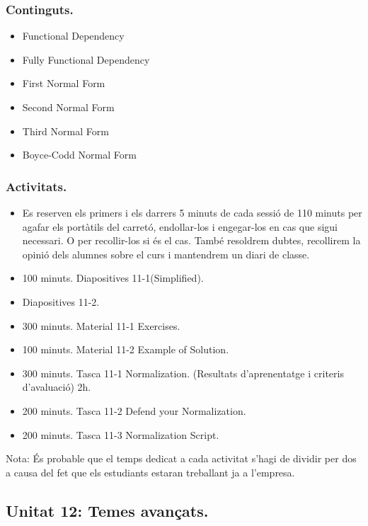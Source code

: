 \documentclass[catalan, a4paper, 12pt, titlepage]{article}
\begin{document}
  \subsubsection{Continguts.}
  \begin{itemize}
	\item Functional Dependency
	\item Fully Functional Dependency
	\item First Normal Form
	\item Second Normal Form
	\item Third Normal Form
	\item Boyce-Codd Normal Form
  \end{itemize}

  \subsubsection{Activitats.}
  \begin{itemize}
          \item Es reserven els primers i els darrers 5 minuts de cada sessió de 110 minuts per agafar els portàtils del carretó, endollar-los i engegar-los en cas que sigui necessari. O per recollir-los si és el cas. També resoldrem dubtes, recollirem la opinió dels alumnes sobre el curs i mantendrem un diari de classe.
	  \item 100 minuts. Diapositives 11-1(Simplified).
	  \item Diapositives 11-2.
	  \item 300 minuts. Material 11-1 Exercises.
	  \item 100 minuts. Material 11-2 Example of Solution.
	  \item 300 minuts. Tasca 11-1 Normalization. (\faGraduationCap Resultats d'aprenentatge i criteris d'avaluació) 2h.
	  \item 200 minuts. Tasca 11-2 Defend your Normalization.
	  \item 200 minuts. Tasca 11-3 Normalization Script.
  \end{itemize}


  Nota: És probable que el temps dedicat a cada activitat s'hagi de dividir per dos a causa del fet que els estudiants estaran treballant ja a l'empresa.

  \subsection{Unitat 12: Temes avançats.}
\end{document}
